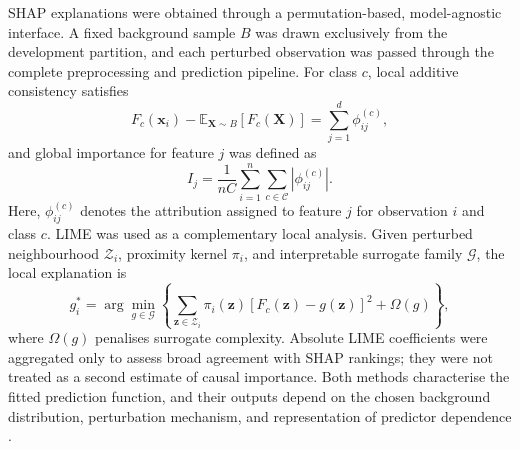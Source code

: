 \documentclass[a4paper,fleqn]{cas-dc}
\begin{document}
SHAP explanations were obtained through a permutation-based, model-agnostic interface. A fixed background sample $B$ was drawn exclusively from the development partition, and each perturbed observation was passed through the complete preprocessing and prediction pipeline. For class $c$, local additive consistency satisfies
\\
\begin{equation}
F_c(\mathbf{x}_i)-\mathbb{E}_{\mathbf{X}\sim B}[F_c(\mathbf{X})]
=\sum_{j=1}^{d}\phi_{ij}^{(c)},
\label{eq:shaplocal}
\end{equation}
and global importance for feature $j$ was defined as
\begin{equation}
I_j=\frac{1}{nC}\sum_{i=1}^{n}\sum_{c\in\mathcal{C}}|\phi_{ij}^{(c)}|.
\label{eq:shapglobal}
\end{equation}
Here, $\phi_{ij}^{(c)}$ denotes the attribution assigned to feature $j$ for observation $i$ and class $c$. LIME was used as a complementary local analysis. Given perturbed neighbourhood $\mathcal{Z}_i$, proximity kernel $\pi_i$, and interpretable surrogate family $\mathcal{G}$, the local explanation is
\begin{equation}
g_i^{*}=\arg\min_{g\in\mathcal{G}}
\left\{\sum_{\mathbf{z}\in\mathcal{Z}_i}\pi_i(\mathbf{z})
[F_c(\mathbf{z})-g(\mathbf{z})]^2+\Omega(g)\right\},
\label{eq:lime}
\end{equation}
where $\Omega(g)$ penalises surrogate complexity. Absolute LIME coefficients were aggregated only to assess broad agreement with SHAP rankings; they were not treated as a second estimate of causal importance. Both methods characterise the fitted prediction function, and their outputs depend on the chosen background distribution, perturbation mechanism, and representation of predictor dependence \cite{instanceshap2023,jung2023}.
\end{document}
